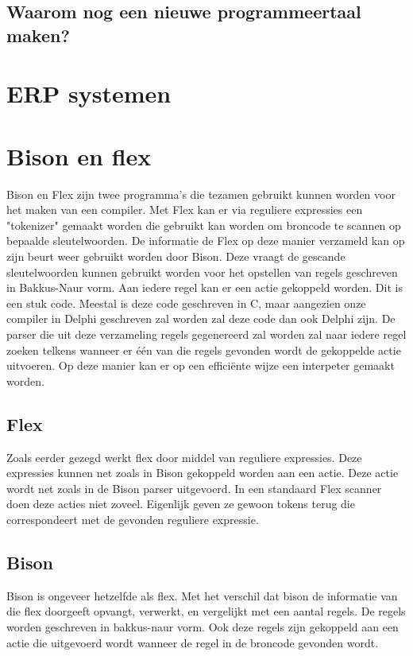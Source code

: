 \documentclass[10pt,a4paper]{article}
\begin{document}
\subsection{Waarom nog een nieuwe programmeertaal maken?}

\section{ERP systemen}


\section{Bison en flex}
Bison en Flex zijn twee programma's die tezamen gebruikt kunnen worden voor het maken van een compiler. Met Flex kan er via reguliere expressies een "tokenizer" gemaakt worden die gebruikt kan worden om broncode te scannen op bepaalde sleutelwoorden. De informatie de Flex op deze manier verzameld kan op zijn beurt weer gebruikt worden door Bison. Deze vraagt de gescande sleutelwoorden kunnen gebruikt worden voor het opstellen van regels geschreven in Bakkus-Naur vorm. Aan iedere regel kan er een actie gekoppeld worden. Dit is een stuk code. Meestal is deze code geschreven in C, maar aangezien onze compiler in Delphi geschreven zal worden zal deze code dan ook Delphi zijn. De parser die uit deze verzameling regels gegenereerd zal worden zal naar iedere regel zoeken telkens wanneer er één van die regels gevonden wordt de gekoppelde actie uitvoeren. Op deze manier kan er op een efficiënte wijze een interpeter gemaakt worden.

\subsection{Flex}
Zoals eerder gezegd werkt flex door middel van reguliere expressies. Deze expressies kunnen net zoals in Bison gekoppeld worden aan een actie. Deze actie wordt net zoals in de Bison parser uitgevoerd. In een standaard Flex scanner doen deze acties niet zoveel. Eigenlijk geven ze gewoon tokens terug die correspondeert met de gevonden reguliere expressie. 

\subsection{Bison}
Bison is ongeveer hetzelfde als flex. Met het verschil dat bison de informatie van die flex doorgeeft opvangt, verwerkt, en vergelijkt met een aantal regels. De regels worden geschreven in bakkus-naur vorm. Ook deze regels zijn gekoppeld aan een actie die uitgevoerd wordt wanneer de regel in de broncode gevonden wordt.
\end{document}
